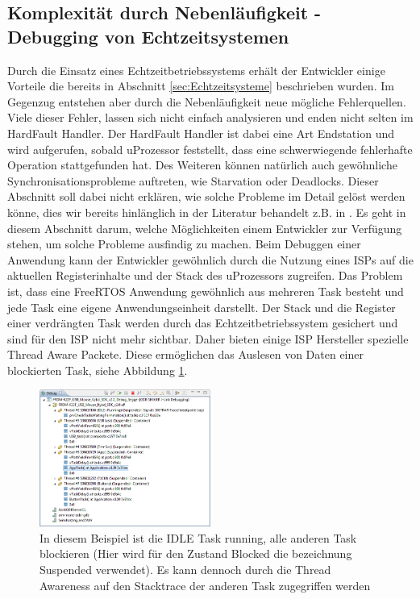 \subsection{Komplexität durch Nebenläufigkeit - Debugging von Echtzeitsystemen}
\label{sec:Debugging von Echtzeitsystemen}
Durch die Einsatz eines Echtzeitbetriebssystems erhält der Entwickler einige Vorteile die bereits in Abschnitt \ref{sec:Echtzeitsysteme} beschrieben wurden. Im Gegenzug entstehen aber durch die Nebenläufigkeit neue mögliche Fehlerquellen. Viele dieser Fehler, lassen sich nicht einfach analysieren und enden nicht selten im HardFault Handler. Der HardFault Handler ist dabei eine Art Endstation und wird aufgerufen, sobald uProzessor feststellt, dass eine schwerwiegende fehlerhafte Operation stattgefunden hat. Des Weiteren können natürlich auch gewöhnliche Synchronisationsprobleme auftreten, wie Starvation oder Deadlocks. Dieser Abschnitt soll dabei nicht erklären, wie solche Probleme im Detail gelöst werden könne, dies wir bereits hinlänglich in der Literatur behandelt z.B. in \cite{9783827373427} \cite{9783864902222}. Es geht in diesem Abschnitt darum, welche Möglichkeiten einem Entwickler zur Verfügung stehen, um solche Probleme ausfindig zu machen.
Beim Debuggen einer Anwendung kann der Entwickler gewöhnlich durch die Nutzung eines ISPs auf die aktuellen Registerinhalte und der Stack des uProzessors zugreifen. Das Problem ist, dass eine FreeRTOS Anwendung gewöhnlich aus mehreren Task besteht und jede Task eine eigene Anwendungseinheit darstellt. Der Stack und die Register einer verdrängten Task werden durch das Echtzeitbetriebssystem gesichert und sind für den ISP nicht mehr sichtbar. Daher bieten einige ISP Hersteller spezielle Thread Aware Packete. Diese ermöglichen das Auslesen von Daten einer blockierten Task, siehe Abbildung \ref{fig:ThreadAware}.
\begin{figure}[htb]
	\centering
		\includegraphics[width=0.5\textwidth]{Pictures/Segger/freertosThreadAwareness}
	\caption{In diesem Beispiel ist die IDLE Task running, alle anderen Task blockieren (Hier wird für den Zustand Blocked die bezeichnung Suspended verwendet). Es kann dennoch durch die Thread Awareness auf den Stacktrace der anderen Task zugegriffen werden }
	\label{fig:ThreadAware}
\end{figure}
